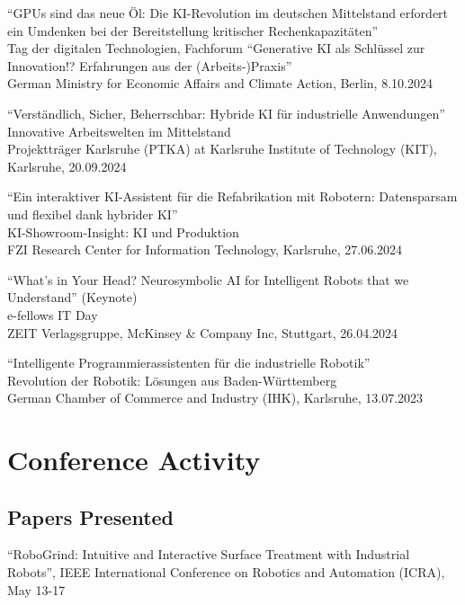 \documentclass[11pt]{article} %
\begin{document}

``GPUs sind das neue Öl: Die KI-Revolution im deutschen Mittelstand erfordert ein Umdenken bei der Bereitstellung kritischer Rechenkapazitäten''\\
Tag der digitalen Technologien, Fachforum ``Generative KI als Schlüssel zur Innovation!? Erfahrungen aus der (Arbeits-)Praxis''\\
German Ministry for Economic Affairs and Climate Action, Berlin, 8.10.2024

\medskip

``Verständlich, Sicher, Beherrschbar: Hybride KI für industrielle Anwendungen''\\
Innovative Arbeitswelten im Mittelstand\\
Projektträger Karlsruhe (PTKA) at Karlsruhe Institute of Technology (KIT), Karlsruhe, 20.09.2024

\medskip

``Ein interaktiver KI-Assistent für die Refabrikation mit Robotern: Datensparsam und flexibel dank hybrider KI''\\
KI-Showroom-Insight: KI und Produktion\\
FZI Research Center for Information Technology, Karlsruhe, 27.06.2024

\medskip

``What's in Your Head? Neurosymbolic AI for Intelligent Robots that we Understand'' (Keynote)\\
e-fellows IT Day\\
ZEIT Verlagsgruppe, McKinsey \& Company Inc, Stuttgart, 26.04.2024

\medskip

``Intelligente Programmierassistenten für die industrielle Robotik''\\
Revolution der Robotik: Lösungen aus Baden-Württemberg\\
German Chamber of Commerce and Industry (IHK), Karlsruhe, 13.07.2023

\section*{Conference Activity}

\subsection*{Papers Presented}

``RoboGrind: Intuitive and Interactive Surface Treatment with Industrial Robots'', IEEE International Conference on Robotics and Automation (ICRA), May 13-17
\end{document}
